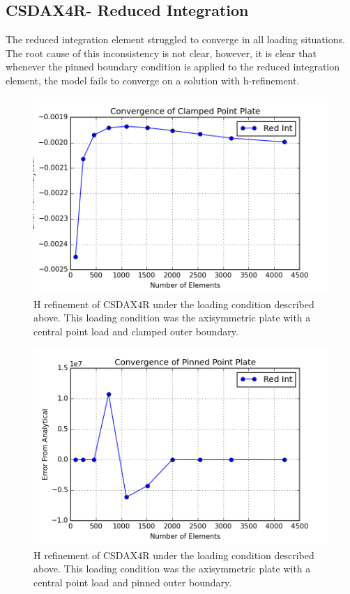 \documentclass[10pt,letterpaper]{report}
\numberwithin{equation}{chapter}
\begin{document}
\newpage
\subsection{CSDAX4R- Reduced Integration}
The reduced integration element struggled to converge in all loading situations. The root cause of this inconsistency is not clear, however, it is clear that whenever the pinned boundary condition is applied to the reduced integration element, the model fails to converge on a solution with h-refinement.

\begin{figure}[H]
\centering
\includegraphics[width=0.7\linewidth]{./GoodImages/Conv_PlPoCl_3}
\caption[H refinement of CSDAX4R]{H refinement of CSDAX4R under the loading condition described above. This loading condition was the axisymmetric plate with a central point load and clamped outer boundary.}
\label{fig:Conv_PlPoCl_3}
\end{figure}

\begin{figure}[H]
\centering
\includegraphics[width=0.7\linewidth]{./GoodImages/Conv_PlPoPi_3}
\caption[H refinement of CSDAX4R]{H refinement of CSDAX4R under the loading condition described above. This loading condition was the axisymmetric plate with a central point load and pinned outer boundary.}
\label{fig:Conv_PlPoCl_3}
\end{figure}
\end{document}
